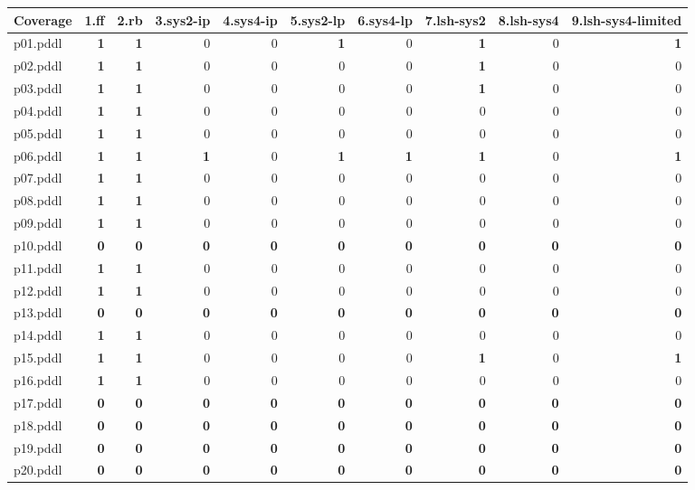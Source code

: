 \documentclass{article}
\begin{document}
\begin{tabular}{@{}lrrrrrrrrr@{}}
Coverage & 1.ff & 2.rb & 3.sys2-ip & 4.sys4-ip & 5.sys2-lp & 6.sys4-lp & 7.lsh-sys2 & 8.lsh-sys4 & 9.lsh-sys4-limited \\
\midrule
p01.pddl & \textbf{1} & \textbf{1} & 0 & 0 & \textbf{1} & 0 & \textbf{1} & 0 & \textbf{1} \\
p02.pddl & \textbf{1} & \textbf{1} & 0 & 0 & 0 & 0 & \textbf{1} & 0 & 0 \\
p03.pddl & \textbf{1} & \textbf{1} & 0 & 0 & 0 & 0 & \textbf{1} & 0 & 0 \\
p04.pddl & \textbf{1} & \textbf{1} & 0 & 0 & 0 & 0 & 0 & 0 & 0 \\
p05.pddl & \textbf{1} & \textbf{1} & 0 & 0 & 0 & 0 & 0 & 0 & 0 \\
p06.pddl & \textbf{1} & \textbf{1} & \textbf{1} & 0 & \textbf{1} & \textbf{1} & \textbf{1} & 0 & \textbf{1} \\
p07.pddl & \textbf{1} & \textbf{1} & 0 & 0 & 0 & 0 & 0 & 0 & 0 \\
p08.pddl & \textbf{1} & \textbf{1} & 0 & 0 & 0 & 0 & 0 & 0 & 0 \\
p09.pddl & \textbf{1} & \textbf{1} & 0 & 0 & 0 & 0 & 0 & 0 & 0 \\
p10.pddl & \textbf{0} & \textbf{0} & \textbf{0} & \textbf{0} & \textbf{0} & \textbf{0} & \textbf{0} & \textbf{0} & \textbf{0} \\
p11.pddl & \textbf{1} & \textbf{1} & 0 & 0 & 0 & 0 & 0 & 0 & 0 \\
p12.pddl & \textbf{1} & \textbf{1} & 0 & 0 & 0 & 0 & 0 & 0 & 0 \\
p13.pddl & \textbf{0} & \textbf{0} & \textbf{0} & \textbf{0} & \textbf{0} & \textbf{0} & \textbf{0} & \textbf{0} & \textbf{0} \\
p14.pddl & \textbf{1} & \textbf{1} & 0 & 0 & 0 & 0 & 0 & 0 & 0 \\
p15.pddl & \textbf{1} & \textbf{1} & 0 & 0 & 0 & 0 & \textbf{1} & 0 & \textbf{1} \\
p16.pddl & \textbf{1} & \textbf{1} & 0 & 0 & 0 & 0 & 0 & 0 & 0 \\
p17.pddl & \textbf{0} & \textbf{0} & \textbf{0} & \textbf{0} & \textbf{0} & \textbf{0} & \textbf{0} & \textbf{0} & \textbf{0} \\
p18.pddl & \textbf{0} & \textbf{0} & \textbf{0} & \textbf{0} & \textbf{0} & \textbf{0} & \textbf{0} & \textbf{0} & \textbf{0} \\
p19.pddl & \textbf{0} & \textbf{0} & \textbf{0} & \textbf{0} & \textbf{0} & \textbf{0} & \textbf{0} & \textbf{0} & \textbf{0} \\
p20.pddl & \textbf{0} & \textbf{0} & \textbf{0} & \textbf{0} & \textbf{0} & \textbf{0} & \textbf{0} & \textbf{0} & \textbf{0} \\
\end{tabular}
\end{document}
